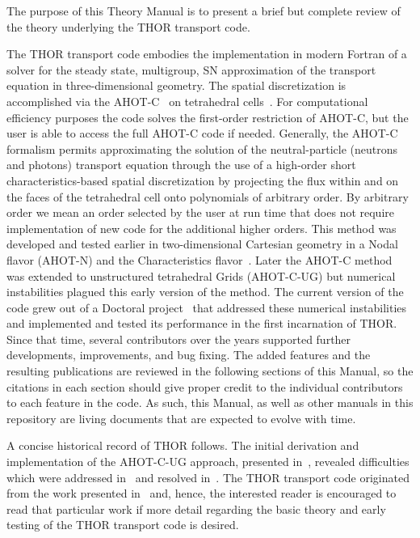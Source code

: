 The purpose of this Theory Manual is to present a brief but complete review of the theory underlying the \ac{THOR} transport code.

The \ac{THOR} transport code embodies the implementation in modern Fortran of a solver for the steady state, multigroup, \ac{SN} approximation of the transport equation in three-dimensional geometry.
The spatial discretization is accomplished via the \ac{AHOT-C}~\cite{Azmy1992} on tetrahedral cells~\cite{Ferrer2012}.
For computational efficiency purposes the code solves the first-order restriction of \ac{AHOT-C}, but the user is able to access the full \ac{AHOT-C} code if needed.
Generally, the \ac{AHOT-C} formalism permits approximating the solution of the neutral-particle (neutrons and photons) transport equation through the use of a high-order short characteristics-based spatial discretization by projecting the flux within and on the faces of the tetrahedral cell onto polynomials of arbitrary order.
By arbitrary order we mean an order selected by the user at run time that does not require implementation of new code for the additional higher orders.
This method was developed and tested earlier in two-dimensional Cartesian geometry in a Nodal flavor (\acs{AHOT-N})\cite{Azmy1988a} and the Characteristics flavor~\cite{Azmy1992}.
Later the \ac{AHOT-C} method was extended to unstructured tetrahedral Grids (\acs{AHOT-C-UG}) but numerical instabilities plagued this early version of the method.
The current version of the code grew out of a Doctoral project~\cite{FerrerPhD} that addressed these numerical instabilities and implemented and tested its performance in the first incarnation of \ac{THOR}.
Since that time, several contributors over the years supported further developments, improvements, and bug fixing.
The added features and the resulting publications are reviewed in the following sections of this Manual, so the citations in each section should give proper credit to the individual contributors to each feature in the code.
As such, this Manual, as well as other manuals in this repository are living documents that are expected to evolve with time.

A concise historical record of \ac{THOR} follows.
The initial derivation and implementation of the \acs{AHOT-C-UG} approach, presented in~\cite{Azmy2001}, revealed difficulties which were addressed in~\cite{Ferrer2009} and resolved in~\cite{FerrerPhD}.
The \ac{THOR} transport code originated from the work presented in~\cite{FerrerPhD} and, hence, the interested reader is encouraged to read that particular work if more detail regarding the basic theory and early testing of the \ac{THOR} transport code is desired.

